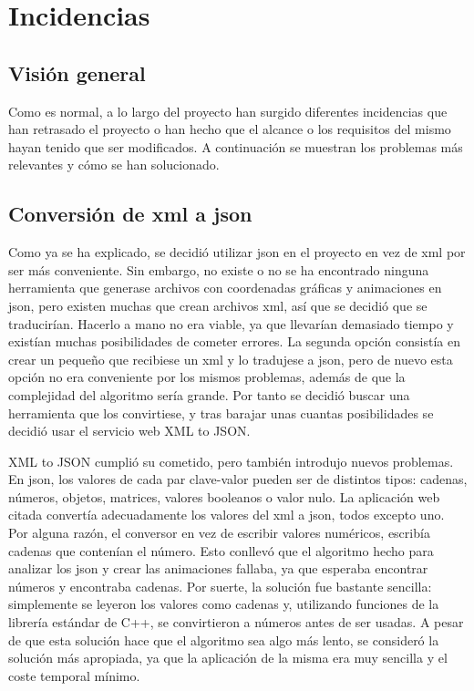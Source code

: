 \chapter{Incidencias}

\section{Visión general}

	Como es normal, a lo largo del proyecto han surgido diferentes incidencias que han retrasado el proyecto o han hecho que el alcance o los requisitos del mismo hayan tenido que ser modificados. A continuación se muestran los problemas más relevantes y cómo se han solucionado.

\section{Conversión de \acrshort{xml} a \acrshort{json}}

	Como ya se ha explicado, se decidió utilizar \acrshort{json} en el proyecto en vez de \acrshort{xml} por ser más conveniente. Sin embargo, no existe o no se ha encontrado ninguna herramienta que generase archivos con coordenadas gráficas y animaciones en \acrshort{json}, pero existen muchas que crean archivos \acrshort{xml}, así que se decidió que se traducirían. Hacerlo a mano no era viable, ya que llevarían demasiado tiempo y existían muchas posibilidades de cometer errores. La segunda opción consistía en crear un pequeño que recibiese un \acrshort{xml} y lo tradujese a \acrshort{json}, pero de nuevo esta opción no era conveniente por los mismos problemas, además de que la complejidad del algoritmo sería grande. Por tanto se decidió buscar una herramienta que los convirtiese, y tras barajar unas cuantas posibilidades se decidió usar el servicio web XML to JSON.

	XML to JSON cumplió su cometido, pero también introdujo nuevos problemas. En \acrshort{json}, los valores de cada par clave-valor pueden ser de distintos tipos: cadenas, números, objetos, matrices, valores booleanos o valor nulo. La aplicación web citada convertía adecuadamente los valores del \acrshort{xml} a \acrshort{json}, todos excepto uno. Por alguna razón, el conversor en vez de escribir valores numéricos, escribía cadenas que contenían el número. Esto conllevó que el algoritmo hecho para analizar los \acrshort{json} y crear las animaciones fallaba, ya que esperaba encontrar números y encontraba cadenas. Por suerte, la solución fue bastante sencilla: simplemente se leyeron los valores como cadenas y, utilizando funciones de la librería estándar de C++, se convirtieron a números antes de ser usadas. A pesar de que esta solución hace que el algoritmo sea algo más lento, se consideró la solución más apropiada, ya que la aplicación de la misma era muy sencilla y el coste temporal mínimo.

